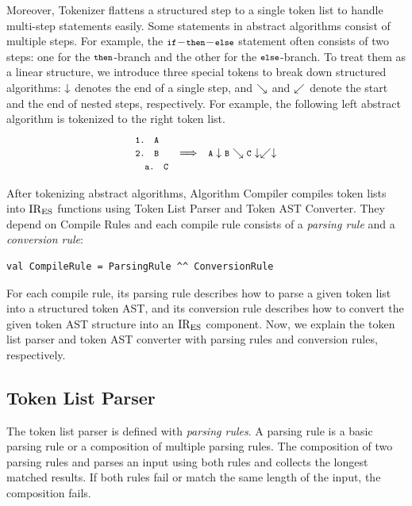 Moreover, {\sf Tokenizer} flattens a structured step to a single token
list to handle multi-step statements easily.  Some statements in
abstract algorithms consist of multiple steps.  For example, the
\( \texttt{\footnotesize if}\!-\!\texttt{\footnotesize then}\!-\!\texttt{\footnotesize else} \) statement often consists of
two steps: one for the \( \texttt{\footnotesize then} \)-branch and the other
for the \( \texttt{\footnotesize else} \)-branch.  To treat them as a linear structure,
we introduce three special tokens to break down structured algorithms:
\( \downarrow \) denotes the end of a single step, and \( \searrow \) and
\( \swarrow \) denote the start and the end of nested steps, respectively.
For example, the following left abstract algorithm is tokenized to the right
token list.
\[
  \begin{array}{lcl}
    \texttt{\footnotesize1. A}\\
    \texttt{\footnotesize2. B} &\Longrightarrow& \texttt{\footnotesize A} \downarrow \texttt{\footnotesize B} \searrow \texttt{\footnotesize C} \downarrow \swarrow \downarrow\\
    \texttt{\footnotesize\ \ a. C}\\
  \end{array}
\]

After tokenizing abstract algorithms, {\sf Algorithm Compiler}
compiles token lists into \( \text{IR}_\text{ES} \) functions using
{\sf Token List Parser} and {\sf Token AST Converter}.
They depend on {\sf Compile Rules} and each compile rule
consists of a \textit{parsing rule} and a \textit{conversion rule}:
\begin{lstlisting}[style=myScalastyle]
val CompileRule = ParsingRule ^^ ConversionRule
\end{lstlisting}
For each compile rule, its parsing rule describes how to parse a given
token list into a structured token AST, and its conversion rule describes
how to convert the given token AST structure into an \( \text{IR}_\text{ES} \) component.
Now, we explain the token list parser and token AST converter with
parsing rules and conversion rules, respectively.


\subsection{Token List Parser}
The token list parser is defined with \textit{parsing rules}. A parsing rule
is a basic parsing rule or a composition of multiple parsing rules. The composition
 of two parsing rules  and  parses an input using
both rules and collects the longest matched results.  If both rules fail or
match the same length of the input, the composition fails.

